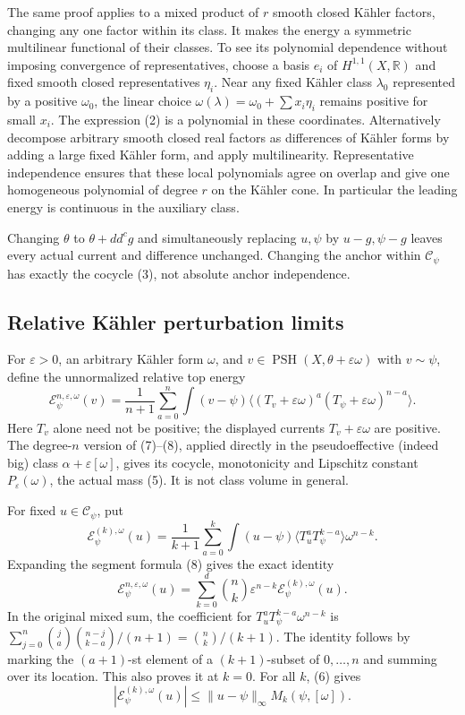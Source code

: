 \documentclass[
  11pt,
]{article}
\begin{document}
The same proof applies to a mixed product of \(r\) smooth closed Kähler
factors, changing any one factor within its class. It makes the energy a
symmetric multilinear functional of their classes. To see its polynomial
dependence without imposing convergence of representatives, choose a
basis \(e_i\) of \(H^{1,1}(X,\mathbb{R})\) and fixed smooth closed
representatives \(\eta_i\). Near any fixed Kähler class \(\lambda_0\)
represented by a positive \(\omega_0\), the linear choice
\(\omega(\lambda)=\omega_0+\sum x_i\eta_i\) remains positive for small
\(x_i\). The expression (2) is a polynomial in these coordinates.
Alternatively decompose arbitrary smooth closed real factors as
differences of Kähler forms by adding a large fixed Kähler form, and
apply multilinearity. Representative independence ensures that these
local polynomials agree on overlap and give one homogeneous polynomial
of degree \(r\) on the Kähler cone. In particular the leading energy is
continuous in the auxiliary class.

Changing \(\theta\) to \(\theta+dd^cg\) and simultaneously replacing
\(u,\psi\) by \(u-g,\psi-g\) leaves every actual current and difference
unchanged. Changing the anchor within \(\mathcal{C}_\psi\) has exactly
the cocycle (3), not absolute anchor independence.

\subsection{Relative Kähler perturbation
limits}\label{relative-kuxe4hler-perturbation-limits}

For \(\varepsilon>0\), an arbitrary Kähler form \(\omega\), and
\(v\in\operatorname{PSH}(X,\theta+\varepsilon\omega)\) with
\(v\sim\psi\), define the unnormalized relative top energy \[
\mathcal{E}^{n,\varepsilon,\omega}_\psi(v)
=\frac1{n+1}\sum_{a=0}^n\int(v-\psi)
\langle(T_v+\varepsilon\omega)^a(T_\psi+\varepsilon\omega)^{n-a}\rangle.
\tag{12}
\] Here \(T_v\) alone need not be positive; the displayed currents
\(T_v+\varepsilon\omega\) are positive. The degree-\(n\) version of
(7)--(8), applied directly in the pseudoeffective (indeed big) class
\(\alpha+\varepsilon[\omega]\), gives its cocycle, monotonicity and
Lipschitz constant \(P_\varepsilon(\omega)\), the actual mass (5). It is
not class volume in general.

For fixed \(u\in\mathcal{C}_\psi\), put \[
\mathcal{E}^{(k),\omega}_\psi(u)=\frac1{k+1}\sum_{a=0}^k
\int(u-\psi)\langle T_u^aT_\psi^{k-a}\rangle\omega^{n-k}.
\] Expanding the segment formula (8) gives the exact identity \[
\mathcal{E}^{n,\varepsilon,\omega}_\psi(u)
=\sum_{k=0}^d\binom nk\varepsilon^{n-k}\mathcal{E}^{(k),\omega}_\psi(u).
\tag{13}
\] In the original mixed sum, the coefficient for
\(T_u^aT_\psi^{k-a}\omega^{n-k}\) is
\(\sum_{j=0}^n\binom ja\binom{n-j}{k-a}/(n+1)
=\binom n k/(k+1)\). The identity follows by marking the \((a+1)\)-st
element of a \((k+1)\)-subset of \({0,\ldots,n}\) and summing over its
location. This also proves it at \(k=0\). For all \(k\), (6) gives \[
|\mathcal{E}^{(k),\omega}_\psi(u)|\leq\|u-\psi\|_\infty M_k(\psi,[\omega]).
\tag{14}
\]
\end{document}

